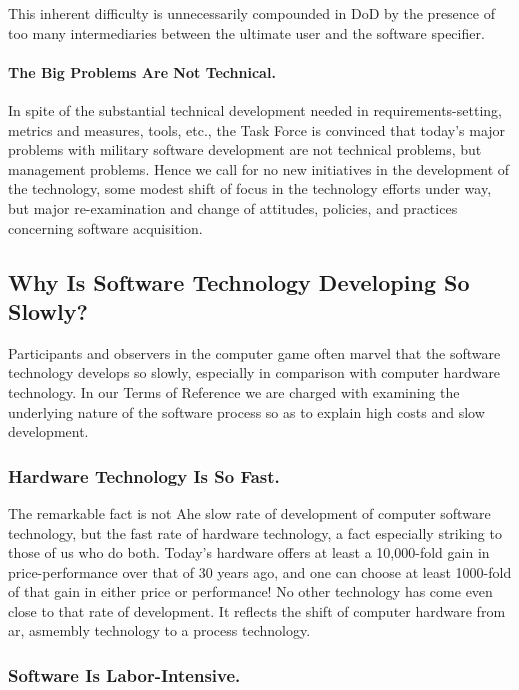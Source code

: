 \documentclass[12pt]{article}
\begin{document}
This inherent difficulty is unnecessarily compounded in DoD by the presence of
too many intermediaries between the ultimate user and the software specifier.

\paragraph{The Big Problems Are Not Technical.} In spite of the substantial
technical development needed in requirements-setting, metrics and measures,
tools, etc., the Task Force is convinced that today's major problems with
military software development are not technical problems, but management
problems. Hence we call for no new initiatives in the development of the
technology, some modest shift of focus in the technology efforts under way, but
major re-examination and change of attitudes, policies, and practices
concerning software acquisition.

\subsection{Why Is Software Technology Developing So Slowly?}

Participants and observers in the computer game often marvel that the software
technology develops so slowly, especially in comparison with computer hardware
technology.  In our Terms of Reference we are charged with examining the
underlying nature of the software process so as to explain high costs and slow
development.

\subsubsection*{Hardware Technology Is So Fast.}

The remarkable fact is not Ahe slow rate of development of computer software
technology, but the fast rate of hardware technology, a fact especially
striking to those of us who do both. Today's hardware offers at least a
10,000-fold gain in price-performance over that of 30 years ago, and one can
choose at least 1000-fold of that gain in either price or performance! No other
technology has come even close to that rate of development.  It reflects the
shift of computer hardware from ar, asmembly technology to a process
technology.

\subsubsection*{Software Is Labor-Intensive.}
\end{document}

